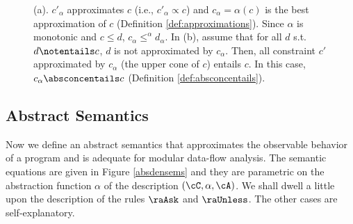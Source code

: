 \documentclass{tlp}
\begin{document}
\begin{figure}
\caption{(a). $c'_\alpha$ approximates $c$ (i.e., $c'_{\alpha} \propto c$) and $c_\alpha = \alpha(c)$ is the best approximation of $c$ (Definition \ref{def:approximations}). Since  $\alpha$ is monotonic and $c\leq d$,  $c_\alpha \leq^\alpha d_\alpha$. In (b), assume that for all $d$ s.t. $d\notentails c$, $d$ is not approximated by $c_\alpha$. Then, all  constraint $c'$ approximated by $c_\alpha$ (the upper cone of $c$) entails $c$. In this case, $c_\alpha \absconcentails c$ (Definition \ref{def:absconcentails}). 
 \label{fig:abs-domains}}

\end{figure}


\subsection{Abstract Semantics}\label{sec:abssemantics}
Now we define an abstract semantics that  approximates the observable behavior of a program and is adequate for modular data-flow analysis. The semantic equations are given in Figure \ref{absdensems} and they are parametric on the abstraction function $\alpha$ of the description $(\cC,\alpha,\cA)$. We shall dwell a little upon the description of the  rules  $\raAsk$ and $\raUnless$. The other cases are self-explanatory.
 
\end{document}
